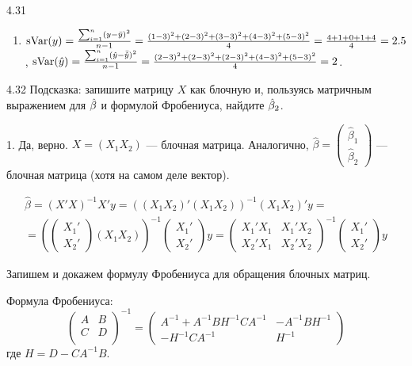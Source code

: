 \begin{solution}{{4.31}}
\begin{enumerate}
 $\sCov(y,\hy)=\frac{\sum_{i=1}^n(y_i-\bar y)(\hy_i-\hat \bar y_i)}{n-1}=\frac{(1-3)(2-3)+(2-3)(2-3)+(3-3)(2-3)+(4-3)(4-3)+(5-3)(5-3)}{4}=\frac{2+1+1+4}{4}=2$
\item $\operatorname{sVar}(y)=\frac{\sum_{i=1}^n(y-\bar y)^2}{n-1}=\frac{(1-3)^2+(2-3)^2+(3-3)^2+(4-3)^2+(5-3)^2}{4}=\frac{4+1+0+1+4}{4}=2.5$, $\operatorname{sVar}(\hat{y})=\frac{\sum_{i=1}^n(\hat{y}- \bar{\hat{y}})^2}{n-1}=\frac{(2-3)^2+(2-3)^2+(2-3)^2+(4-3)^2+(5-3)^2}{4}=2$.

\end{enumerate}
\end{solution}
\protect \hypertarget {soln:4.32}{}
\begin{solution}{{4.32}}
Подсказка: запишите матрицу $X$ как блочную и, пользуясь матричным выражением для $\hat{\beta}$ и формулой Фробениуса, найдите $\hat{\beta}_2$.

1. Да, верно.
$X=(X_1 X_2)$ — блочная матрица. Аналогично, $\hat\beta=\left(\begin{array}{c}
\hat\beta_1\\
\hat\beta_2
\end{array}\right)$ — блочная матрица (хотя на самом деле вектор).

\begin{multline*}
\hat\beta=(X'X)^{-1}X'y=((X_1X_2)'(X_1X_2))^{-1}(X_1X_2)'y=\\
=\left(
\begin{pmatrix}
X_1'\\
X_2'
\end{pmatrix}(X_1X_2)\right)^{-1}
\begin{pmatrix}
X_1'\\
X_2'
\end{pmatrix}y=
\begin{pmatrix}
X_1'X_1 & X_1'X_2\\
X_2'X_1 & X_2'X_2
\end{pmatrix}^{-1}
\begin{pmatrix}
X_1'\\
X_2'
\end{pmatrix}y
\end{multline*}

Запишем и докажем формулу Фробениуса для обращения блочных матриц.

Формула Фробениуса:
\[
\begin{pmatrix} A & B \\
C & D \\
\end{pmatrix}^{-1}=
\begin{pmatrix}
A^{-1} +A^{-1} BH^{-1} CA^{-1}  & -A^{-1} BH^{-1}\\
 -H^{-1} CA^{-1}  & H^{-1}
\end{pmatrix}
\]
где $H=D-CA^{-1}B$.


\end{solution}
